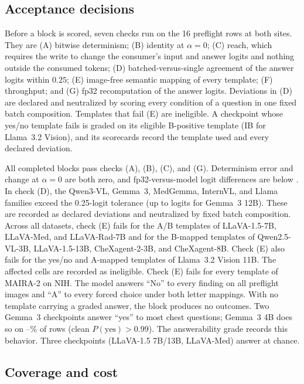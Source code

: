 \subsection{Acceptance decisions}
\label{app:cf-gates}

Before a block is scored, seven checks run on the 16 preflight rows at both sites. They are (A) bitwise determinism; (B) identity at $\alpha=0$; (C) reach, which requires the write to change the consumer's input and answer logits and nothing outside the consumed tokens; (D) batched-versus-single agreement of the answer logits within $0.25$; (E) image-free semantic mapping of every template; (F) throughput; and (G) fp32 recomputation of the answer logits. Deviations in (D) are declared and neutralized by scoring every condition of a question in one fixed batch composition. Templates that fail (E) are ineligible. A checkpoint whose yes/no template fails is graded on its eligible B-positive template (IB for Llama~3.2 Vision), and its scorecards record the template used and every declared deviation.

All \cfWriteBlocks{} completed blocks pass checks (A), (B), (C), and (G). Determinism error and change at $\alpha=0$ are both zero, and fp32-versus-model logit differences are below \cfGateFpMax{}. In check (D), the Qwen3-VL, Gemma~3, MedGemma, InternVL, and Llama families exceed the 0.25-logit tolerance (up to \cfGateBatchMax{} logits for Gemma~3 12B). These are recorded as declared deviations and neutralized by fixed batch composition. Across all datasets, check (E) fails for the A/B templates of LLaVA-1.5-7B, LLaVA-Med, and LLaVA-Rad-7B and for the B-mapped templates of Qwen2.5-VL-3B, LLaVA-1.5-13B, CheXagent-2-3B, and CheXagent-8B. Check (E) also fails for the yes/no and A-mapped templates of Llama~3.2 Vision 11B. The affected cells are recorded as ineligible. Check (E) fails for every template of MAIRA-2 \citep{bannur2024maira} on NIH. The model answers ``No'' to every finding on all \cfSpecUngradedRows{} preflight images and ``A'' to every forced choice under both letter mappings. With no template carrying a graded answer, the block produces no outcomes. Two Gemma~3 checkpoints answer ``yes'' to most chest questions; Gemma~3 4B does so on \cfGemmaFourYesMin--\cfGemmaFourYesMax\% of rows (clean $P(\mathrm{yes})>0.99$). The answerability grade records this behavior. Three checkpoints (LLaVA-1.5 7B/13B, LLaVA-Med) answer at chance.

\subsection{Coverage and cost}
\label{app:cf-coverage}

